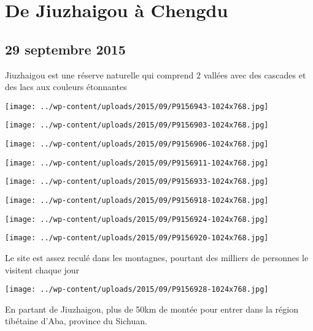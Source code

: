 \chapter{De Jiuzhaigou à Chengdu}
\section*{29 septembre 2015}
Jiuzhaigou est une réserve naturelle qui comprend 2 vallées avec des cascades et des lacs aux couleurs étonnantes \newline
 \newline
\centerline{\texttt{[image: ../wp-content/uploads/2015/09/P9156943-1024x768.jpg]} } 
 \newline
 \newline
\centerline{\texttt{[image: ../wp-content/uploads/2015/09/P9156903-1024x768.jpg]} } 
 \newline
 \newline
\centerline{\texttt{[image: ../wp-content/uploads/2015/09/P9156906-1024x768.jpg]} } 
 \newline
 \newline
\centerline{\texttt{[image: ../wp-content/uploads/2015/09/P9156911-1024x768.jpg]} } 
 \newline
 \newline
\centerline{\texttt{[image: ../wp-content/uploads/2015/09/P9156933-1024x768.jpg]} } 
 \newline
 \newline
\centerline{\texttt{[image: ../wp-content/uploads/2015/09/P9156918-1024x768.jpg]} } 
 \newline
 \newline
\centerline{\texttt{[image: ../wp-content/uploads/2015/09/P9156924-1024x768.jpg]} } 
 \newline
 \newline
\centerline{\texttt{[image: ../wp-content/uploads/2015/09/P9156920-1024x768.jpg]} } 
 \newline
 Le site est assez reculé dans les montagnes, pourtant des milliers de personnes le visitent chaque jour \newline
 \newline
\centerline{\texttt{[image: ../wp-content/uploads/2015/09/P9156928-1024x768.jpg]} } 
 \newline
 En partant de Jiuzhaigou, plus de 50km de montée pour entrer dans la région tibétaine d'Aba, province du Sichuan. \newline
